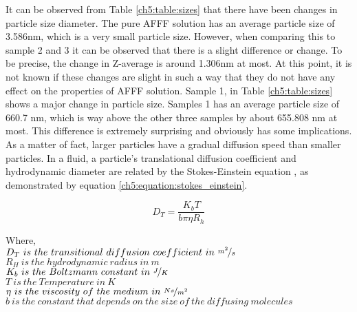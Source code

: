 It can be observed from Table \ref{ch5:table:sizes} that there have been changes in particle size diameter. The pure AFFF solution has an average particle size of 3.586nm, which is a very small particle size. However, when comparing this to sample 2 and 3 it can be observed that there is a slight difference or change. To be precise, the change in Z-average is around 1.306nm at most. At this point, it is not known if these changes are slight in such a way that they do not have any effect on the properties of AFFF solution. Sample 1, in Table \ref{ch5:table:sizes} shows a major change in particle size. Samples 1 has an average particle size of 660.7 nm, which is way above the other three samples by about 655.808 nm at most. This difference is extremely surprising and obviously has some implications. As a matter of fact, larger particles have a gradual diffusion speed than smaller particles. In a fluid, a particle's translational diffusion coefficient and hydrodynamic diameter are related by the Stokes-Einstein equation \cite{lin1991handbook}, as demonstrated by equation \ref{ch5:equation:stokes_einstein}.

\begin{equation}
    D_T=\frac{K_bT}{b\pi \eta R_h}
    \label{ch5:equation:stokes_einstein}
\end{equation}

\begin{doublespace}
    Where, \\
    $D_T\ is\ the\ transitional\ diffusion\ coefficient\ in\ \nicefrac{m^2}{s}$ \\
    $R_H\ is\ the\ hydrodynamic\ radius\ in\ m$ \\
    $K_b\ is\ the\ Boltzmann\ constant\ in\ \nicefrac{J}{K}$ \\
    $T\ is\ the\ Temperature\ in\ K$ \\
    $\eta\ is\ the\ viscosity\ of\ the\ medium\ in\ \nicefrac{Ns}{m^2}$ \\
    $b\ is\ the\ constant\ that\ depends\ on\ the\ size\ of\ the\ diffusing\ molecules$ \\
\end{doublespace}

